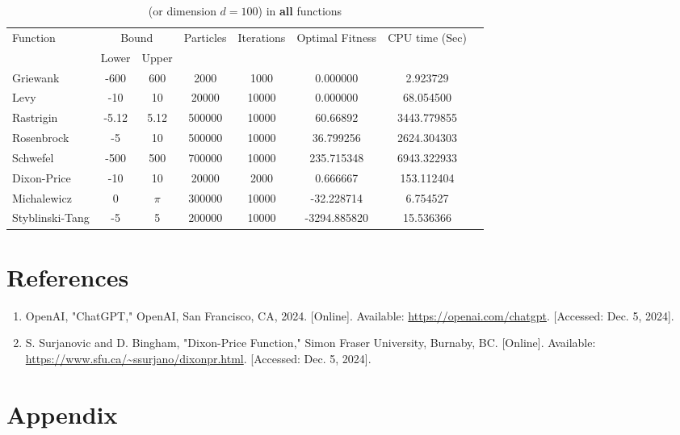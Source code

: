 \documentclass[12pt]{article}
\begin{document}
	\begin{table}[H]
		\caption{ (or dimension $d=100$) in \textbf{all} functions}
		\label{table:3}
		\centering
		\begin{tabular}{l c c c c c c c}
			\hline
			Function &  \multicolumn{2}{c}{Bound} & Particles & Iterations &  Optimal Fitness & CPU time (Sec) \\
			& Lower& Upper&&&\\
			\hline
			Griewank  & -600 & 600 & 2000 & 1000 & 0.000000 & 2.923729 \\
			Levy      & -10  & 10  & 20000 & 10000 & 0.000000 & 68.054500 \\
			Rastrigin & -5.12 & 5.12 & 500000 & 10000 & 60.66892 & 3443.779855 \\    
			Rosenbrock& -5   & 10  & 500000 & 10000 & 36.799256 & 2624.304303 \\
			Schwefel  & -500 & 500 & 700000 & 10000 & 235.715348 & 6943.322933 \\
			Dixon-Price & -10 & 10  & 20000 & 2000 & 0.666667 & 153.112404 \\
			Michalewicz & 0  & $\pi$ & 300000 & 10000 & -32.228714 & 6.754527 \\
			Styblinski-Tang & -5 & 5 & 200000 & 10000 & -3294.885820 & 15.536366 \\
			\hline
		\end{tabular}
	\end{table}
	
	



\section{References}

\begin{enumerate}
    \item OpenAI, "ChatGPT," OpenAI, San Francisco, CA, 2024. [Online]. Available: \url{https://openai.com/chatgpt}. [Accessed: Dec. 5, 2024].
    \item S. Surjanovic and D. Bingham, "Dixon-Price Function," Simon Fraser University, Burnaby, BC. [Online]. Available: \url{https://www.sfu.ca/~ssurjano/dixonpr.html}. [Accessed: Dec. 5, 2024].
\end{enumerate}

	
	
	
	
	 
	\newpage
	\section{Appendix}
\end{document}

